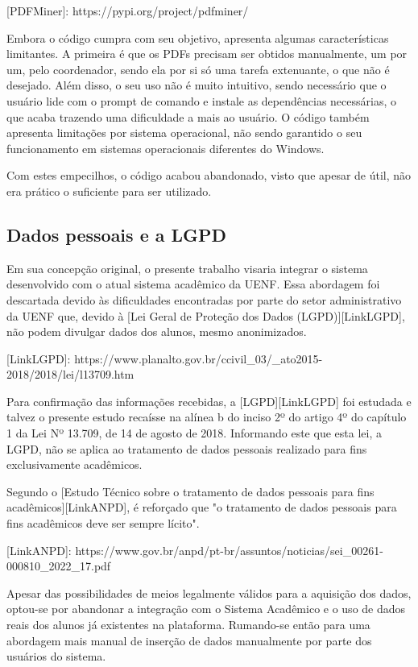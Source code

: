         [PDFMiner]: https://pypi.org/project/pdfminer/

        Embora o código cumpra com seu objetivo, apresenta algumas características limitantes. A primeira é que os PDFs precisam ser obtidos manualmente, um por um, pelo coordenador, sendo ela por si só uma tarefa extenuante, o que não é desejado. Além disso, o seu uso não é muito intuitivo, sendo necessário que o usuário lide com o prompt de comando e instale as dependências necessárias, o que acaba trazendo uma dificuldade a mais ao usuário. O código também apresenta limitações por sistema operacional, não sendo garantido o seu funcionamento em sistemas operacionais diferentes do Windows.

        Com estes empecilhos, o código acabou abandonado, visto que apesar de útil, não era prático o suficiente para ser utilizado.

\subsection{Dados pessoais e a LGPD} %

    Em sua concepção original, o presente trabalho visaria integrar o sistema desenvolvido com o atual sistema acadêmico da UENF. Essa abordagem foi descartada devido às dificuldades encontradas por parte do setor administrativo da UENF que, devido à [Lei Geral de Proteção dos Dados (LGPD)][LinkLGPD], não podem divulgar dados dos alunos, mesmo anonimizados.

    [LinkLGPD]: https://www.planalto.gov.br/ccivil_03/_ato2015-2018/2018/lei/l13709.htm

    Para confirmação das informações recebidas, a [LGPD][LinkLGPD] foi estudada e talvez o presente estudo recaísse na alínea b do inciso 2º do artigo 4º do capítulo 1 da Lei Nº 13.709, de 14 de agosto de 2018. Informando este que esta lei, a LGPD, não se aplica ao tratamento de dados pessoais realizado para fins exclusivamente acadêmicos.

    Segundo o [Estudo Técnico sobre o tratamento de dados pessoais para fins acadêmicos][LinkANPD], é reforçado que "o tratamento de dados pessoais para fins acadêmicos deve ser sempre lícito".

    [LinkANPD]: https://www.gov.br/anpd/pt-br/assuntos/noticias/sei_00261-000810_2022_17.pdf

    Apesar das possibilidades de meios legalmente válidos para a aquisição dos dados, optou-se por abandonar a integração com o Sistema Acadêmico e o uso de dados reais dos alunos já existentes na plataforma. Rumando-se então para uma abordagem mais manual de inserção de dados manualmente por parte dos usuários do sistema.

